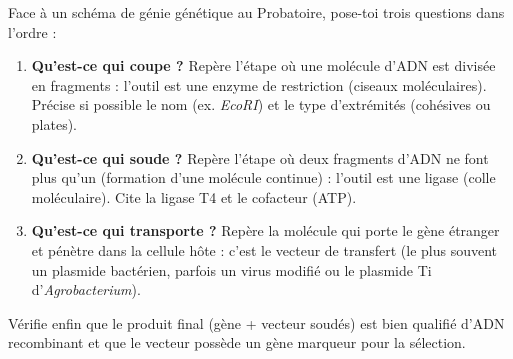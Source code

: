 \documentclass[11pt]{article}
\newcommand{\cle}[1]{{\popxbold\color{popdark}#1}}
\begin{document}
\begin{methode}
Face à un schéma de génie génétique au Probatoire, pose-toi trois questions dans l'ordre :
\begin{enumerate}
\item \textbf{Qu'est-ce qui coupe ?} Repère l'étape où une molécule d'ADN est divisée en fragments : l'outil est une \cle{enzyme de restriction} (ciseaux moléculaires). Précise si possible le nom (ex. \emph{EcoRI}) et le type d'extrémités (cohésives ou plates).
\item \textbf{Qu'est-ce qui soude ?} Repère l'étape où deux fragments d'ADN ne font plus qu'un (formation d'une molécule continue) : l'outil est une \cle{ligase} (colle moléculaire). Cite la ligase T4 et le cofacteur (ATP).
\item \textbf{Qu'est-ce qui transporte ?} Repère la molécule qui porte le gène étranger et pénètre dans la cellule hôte : c'est le \cle{vecteur de transfert} (le plus souvent un plasmide bactérien, parfois un virus modifié ou le plasmide Ti d'\emph{Agrobacterium}).
\end{enumerate}
Vérifie enfin que le produit final (gène + vecteur soudés) est bien qualifié d'\cle{ADN recombinant} et que le vecteur possède un gène marqueur pour la sélection.
\end{methode}
\end{document}
